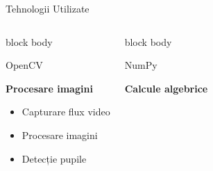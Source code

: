 \documentclass[aspectratio=169,9pt]{beamer}
\begin{document}
\begin{frame}{Tehnologii Utilizate}
        \vspace{-0.6cm}
        \begin{columns}[T]
                        \begin{beamercolorbox}[rounded=true,shadow=true,sep=0.7em]{block body}
                                \begin{center}
                                        {\fontsize{18}{18}\selectfont\textcolor{mainblue}{OpenCV}}
                                        \vspace{0.1cm}
                                        
                                        \textbf{\small Procesare imagini}
                                        \vspace{0.1cm}
                                        
                                        \footnotesize 
                                        \begin{itemize}[leftmargin=*]
                                            \setlength{\itemsep}{0pt}
                                            \item Capturare flux video
                                            \item Procesare imagini
                                            \item Detecție pupile
                                        \end{itemize}
                                \end{center}
                        \end{beamercolorbox}
                        
                        \vspace{0.3cm}
                        
                        \begin{beamercolorbox}[rounded=true,shadow=true,sep=0.7em]{block body}
                                \begin{center}
                                        {\fontsize{18}{18}\selectfont\textcolor{mainblue}{NumPy}}
                                        \vspace{0.1cm}
                                        
                                        \textbf{\small Calcule algebrice}
                                        \vspace{0.1cm}
                                        

\end{center}
\end{beamercolorbox}
\end{columns}
\end{frame}
\end{document}
